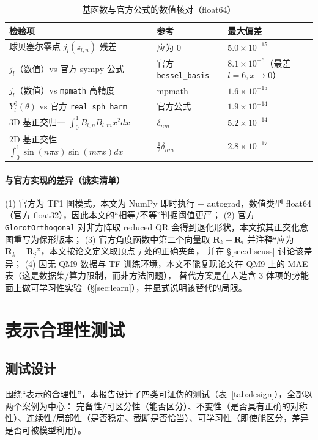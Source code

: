 \documentclass[UTF8,a4paper,11pt]{ctexart}
\begin{document}
\begin{table}[H]
\centering\small
\caption{基函数与官方公式的数值核对（float64）}
\label{tab:valid}
\begin{tabular}{@{}lll@{}}
\toprule
检验项 & 参考 & 最大偏差\\
\midrule
球贝塞尔零点 $j_l(z_{l,n})$ 残差 & 应为 0 & $5.0\times10^{-15}$\\
$j_l$（数值）vs 官方 sympy 公式 & 官方 \texttt{bessel\_basis} & $8.1\times10^{-6}$（最差 $l=6,x\to0$）\\
$j_l$（数值）vs \texttt{mpmath} 高精度 & mpmath & $1.6\times10^{-15}$\\
$Y_l^0(\theta)$ vs 官方 \texttt{real\_sph\_harm} & 官方公式 & $1.9\times10^{-14}$\\
3D 基正交归一 $\int_0^1 B_{l,n}B_{l,m}x^2dx$ & $\delta_{nm}$ & $5.2\times10^{-14}$\\
2D 基正交性 $\int_0^1\sin(n\pi x)\sin(m\pi x)dx$ & $\tfrac12\delta_{nm}$ & $2.8\times10^{-17}$\\
\bottomrule
\end{tabular}
\end{table}

\paragraph{与官方实现的差异（诚实清单）}
(1) 官方为 TF1 图模式，本文为 NumPy 即时执行 + autograd，数值类型 float64（官方 float32），因此本文的“相等/不等”判据阈值更严；
(2) 官方 \texttt{GlorotOrthogonal} 对非方阵取 reduced QR 会得到退化形状，本文按其正交化意图重写为保形版本；
(3) 官方角度函数中第二个向量取 $\bm R_k-\bm R_i$ 并注释“应为 $\bm R_k-\bm R_j$”，本文按论文定义取顶点 $j$ 处的正确夹角，
并在 \S\ref{sec:discuss} 讨论该差异；
(4) 因无 QM9 数据与 TF 训练环境，本文不能复现论文在 QM9 上的 MAE 表（这是数据集/算力限制，而非方法问题），
替代方案是在人造含 3 体项的势能面上做可学习性实验（\S\ref{sec:learn}），并显式说明该替代的局限。

\section{表示合理性测试}

\subsection{测试设计}
围绕“表示的合理性”，本报告设计了四类可证伪的测试（表~\ref{tab:design}），全部以两个案例为中心：
完备性/可区分性（能否区分）、不变性（是否具有正确的对称性）、连续性/局部性（是否稳定、截断是否恰当）、可学习性（即使能区分，差异是否可被模型利用）。
\end{document}
